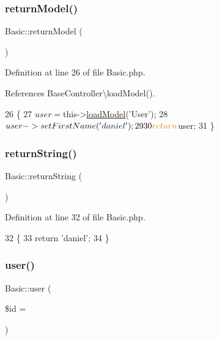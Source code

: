\subsubsection{\texorpdfstring{return\+Model()}{returnModel()}}
{\footnotesize\ttfamily Basic\+::return\+Model (\begin{DoxyParamCaption}{ }\end{DoxyParamCaption})}



Definition at line 26 of file Basic.\+php.



References Base\+Controller\textbackslash{}load\+Model().


\begin{DoxyCode}
26                                   \{
27         $user = $this->\hyperlink{class_base_controller_a710080f75b12adc69eb506ee63cffe6b}{loadModel}(\textcolor{stringliteral}{'User'});
28         $user->setFirstName(\textcolor{stringliteral}{'daniel'});
29 
30         \textcolor{keywordflow}{return} $user;
31     \}
\end{DoxyCode}
\hypertarget{class_basic_a00d093f162848a1bd2e6e48d7cd68ab0}{}\label{class_basic_a00d093f162848a1bd2e6e48d7cd68ab0} 
\subsubsection{\texorpdfstring{return\+String()}{returnString()}}
{\footnotesize\ttfamily Basic\+::return\+String (\begin{DoxyParamCaption}{ }\end{DoxyParamCaption})}



Definition at line 32 of file Basic.\+php.


\begin{DoxyCode}
32                                    \{
33         \textcolor{keywordflow}{return} \textcolor{stringliteral}{'daniel'};
34     \}
\end{DoxyCode}
\hypertarget{class_basic_a64bf4d807057c1060a0f402c2cbe4fef}{}\label{class_basic_a64bf4d807057c1060a0f402c2cbe4fef} 
\subsubsection{\texorpdfstring{user()}{user()}}
{\footnotesize\ttfamily Basic\+::user (\begin{DoxyParamCaption}\item[{}]{\$id = {\ttfamily \textquotesingle{}\textquotesingle{}} }\end{DoxyParamCaption})}



